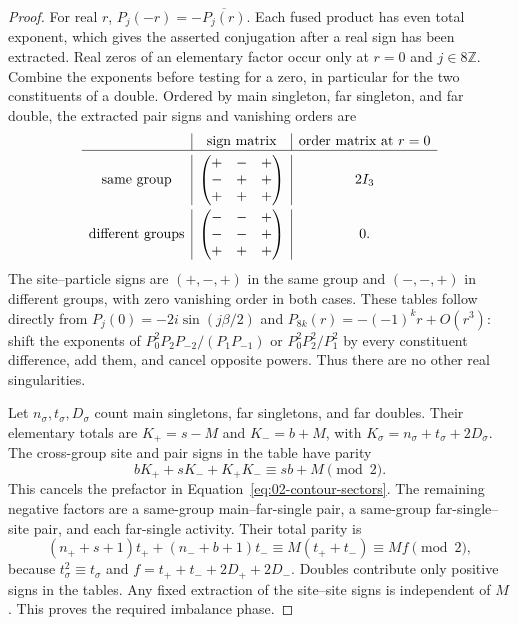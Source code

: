 \begin{proof}
For real $r$, $P_j(-r)=-\overline{P_j(r)}$. Each fused product has
even total exponent, which gives the asserted conjugation after a
real sign has been extracted. Real zeros of an elementary factor occur
only at $r=0$ and $j\in8\mathbb Z$. Combine the exponents before
testing for a zero, in particular for the two constituents of a
double. Ordered by main singleton, far singleton, and far double,
the extracted pair signs and vanishing orders are
\[
\begin{array}{c|c|c}
 &\text{sign matrix}&\text{order matrix at }r=0\\\hline\noalign{\vskip 3pt}
\text{same group}&
 \begin{pmatrix}+&-&+\\-&+&+\\+&+&+\end{pmatrix}&2I_3\\\noalign{\vskip 3pt}
\text{different groups}&
 \begin{pmatrix}-&-&+\\-&-&+\\+&+&+\end{pmatrix}&0.
\end{array}
\]
The site--particle signs are $(+,-,+)$ in the same group and
$(-,-,+)$ in different groups, with zero vanishing order in both
cases. These tables follow directly from $P_j(0)=-2i\sin(j\beta/2)$
and $P_{8k}(r)=-(-1)^kr+O(r^3)$: shift the exponents of
$P_0^2P_2P_{-2}/(P_1P_{-1})$ or $P_0^2P_2^2/P_1^2$ by every
constituent difference, add them, and cancel opposite powers. Thus
there are no other real singularities.

Let $n_\sigma,t_\sigma,D_\sigma$ count main singletons, far
singletons, and far doubles. Their elementary totals are
$K_+=s-M$ and $K_-=b+M$, with
$K_\sigma=n_\sigma+t_\sigma+2D_\sigma$.
The cross-group site and pair signs in the table have parity
\[
 bK_++sK_-+K_+K_-\equiv sb+M\pmod2.
\]
This cancels the prefactor in Equation~\eqref{eq:02-contour-sectors}.
The remaining negative factors are a same-group main--far-single
pair, a same-group far-single--site pair, and each far-single activity.
Their total parity is
\[
 (n_++s+1)t_++(n_-+b+1)t_-
 \equiv M(t_++t_-)\equiv Mf\pmod2,
\]
because $t_\sigma^2\equiv t_\sigma$ and
$f=t_++t_-+2D_++2D_-$. Doubles contribute only positive signs in
the tables. Any fixed extraction of the site--site signs is independent
of $M$. This proves the required imbalance phase.
\end{proof}


